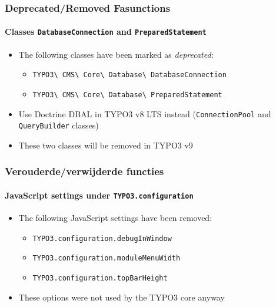\begin{frame}[fragile]
	\frametitle{Deprecated/Removed Fasunctions}
	\framesubtitle{Classes \texttt{DatabaseConnection} and \texttt{PreparedStatement}}

	\begin{itemize}
		\item The following classes have been marked as \textit{deprecated}:
			\begin{itemize}
				\item \texttt{TYPO3\textbackslash
						CMS\textbackslash
						Core\textbackslash
						Database\textbackslash
						DatabaseConnection}
				\item \texttt{TYPO3\textbackslash
						CMS\textbackslash
						Core\textbackslash
						Database\textbackslash
						PreparedStatement}
			\end{itemize}
		\item Use Doctrine DBAL in TYPO3 v8 LTS instead\newline
				(\texttt{ConnectionPool} and \texttt{QueryBuilder} classes)
		\item These two classes will be removed in TYPO3 v9
	\end{itemize}

\end{frame}


\begin{frame}[fragile]
	\frametitle{Verouderde/verwijderde functies}
	\framesubtitle{JavaScript settings under \texttt{TYPO3.configuration}}

	\begin{itemize}
		\item The following JavaScript settings have been removed:

		\begin{itemize}
			\item \texttt{TYPO3.configuration.debugInWindow}
			\item \texttt{TYPO3.configuration.moduleMenuWidth}
			\item \texttt{TYPO3.configuration.topBarHeight}
		\end{itemize}

		\item These options were not used by the TYPO3 core anyway

	\end{itemize}

\end{frame}



